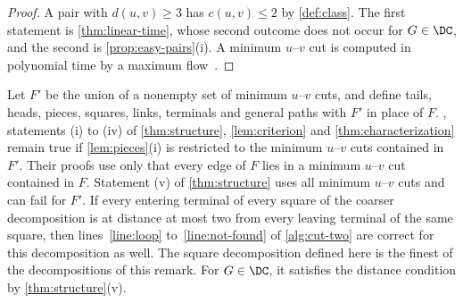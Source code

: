 \begin{proof}
A pair with $d(u, v) \geq 3$ has $c(u, v) \leq 2$ by \cref{def:class}.
The first statement is \cref{thm:linear-time}, whose second outcome does not occur for $G \in \DC$, and the second is \cref{prop:easy-pairs}(i).
A minimum $u$--$v$ cut is computed in polynomial time by a maximum flow~\cite[Sections~10.3 and~10.4]{Erickson2019Algorithms}.
\end{proof}

\begin{remark}
\label{rem:coarser}
Let $F'$ be the union of a nonempty set of minimum $u$--$v$ cuts, and define tails, heads, pieces, squares, links, terminals and general paths with $F'$ in place of $F$.
, statements (i) to (iv) of \cref{thm:structure}, \cref{lem:criterion} and \cref{thm:characterization} remain true if \cref{lem:pieces}(i) is restricted to the minimum $u$--$v$ cuts contained in $F'$.
Their proofs use only that every edge of $F$ lies in a minimum $u$--$v$ cut contained in $F$.
Statement (v) of \cref{thm:structure} uses all minimum $u$--$v$ cuts and can fail for $F'$.
If every entering terminal of every square of the coarser decomposition is at distance at most two from every leaving terminal of the same square, then lines~\ref{line:loop} to~\ref{line:not-found} of \cref{alg:cut-two} are correct for this decomposition as well.
The square decomposition defined here is the finest of the decompositions of this remark.
For $G \in \DC$, it satisfies the distance condition by \cref{thm:structure}(v).
\end{remark}

